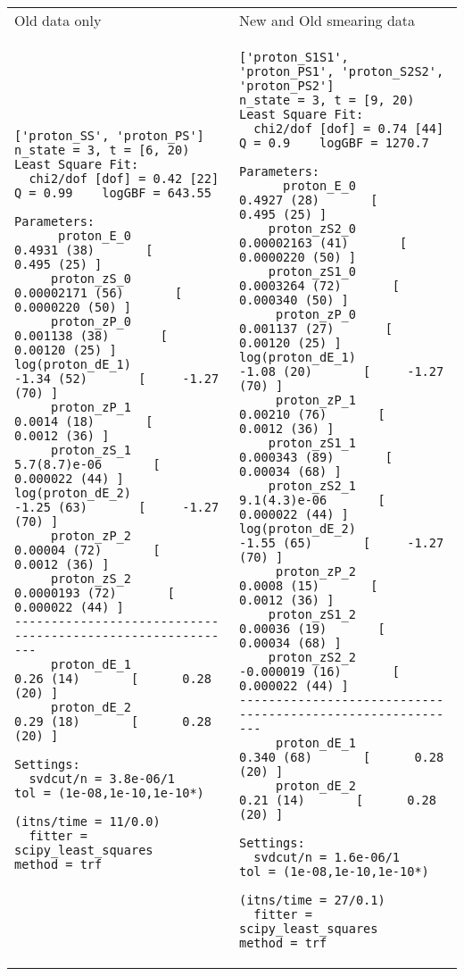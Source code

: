 \documentclass[prd,tightenlines,preprintnumbers,showpacs,superscriptaddress,notitlepage,nofootinbib,eqsecnum,floatfix,notitlepage]{revtex4-1}
\begin{document}
\bigskip
\begin{tabular}{p{3.25in}p{3.25in}}
Old data only & New and Old smearing data\\
{\scriptsize
\begin{verbatim}
['proton_SS', 'proton_PS']
n_state = 3, t = [6, 20)
Least Square Fit:
  chi2/dof [dof] = 0.42 [22]    Q = 0.99    logGBF = 643.55

Parameters:
      proton_E_0       0.4931 (38)       [     0.495 (25) ]
     proton_zS_0   0.00002171 (56)       [ 0.0000220 (50) ]
     proton_zP_0     0.001138 (38)       [   0.00120 (25) ]
log(proton_dE_1)        -1.34 (52)       [     -1.27 (70) ]
     proton_zP_1       0.0014 (18)       [    0.0012 (36) ]
     proton_zS_1      5.7(8.7)e-06       [  0.000022 (44) ]
log(proton_dE_2)        -1.25 (63)       [     -1.27 (70) ]
     proton_zP_2      0.00004 (72)       [    0.0012 (36) ]
     proton_zS_2    0.0000193 (72)       [  0.000022 (44) ]
-----------------------------------------------------------
     proton_dE_1         0.26 (14)       [      0.28 (20) ]
     proton_dE_2         0.29 (18)       [      0.28 (20) ]

Settings:
  svdcut/n = 3.8e-06/1    tol = (1e-08,1e-10,1e-10*)
                   (itns/time = 11/0.0)
  fitter = scipy_least_squares    method = trf\end{verbatim}
}
&
{\scriptsize
\begin{verbatim}
['proton_S1S1', 'proton_PS1', 'proton_S2S2', 'proton_PS2']
n_state = 3, t = [9, 20)
Least Square Fit:
  chi2/dof [dof] = 0.74 [44]    Q = 0.9    logGBF = 1270.7

Parameters:
      proton_E_0       0.4927 (28)       [     0.495 (25) ]
    proton_zS2_0   0.00002163 (41)       [ 0.0000220 (50) ]
    proton_zS1_0    0.0003264 (72)       [  0.000340 (50) ]
     proton_zP_0     0.001137 (27)       [   0.00120 (25) ]
log(proton_dE_1)        -1.08 (20)       [     -1.27 (70) ]
     proton_zP_1      0.00210 (76)       [    0.0012 (36) ]
    proton_zS1_1     0.000343 (89)       [   0.00034 (68) ]
    proton_zS2_1      9.1(4.3)e-06       [  0.000022 (44) ]
log(proton_dE_2)        -1.55 (65)       [     -1.27 (70) ]
     proton_zP_2       0.0008 (15)       [    0.0012 (36) ]
    proton_zS1_2      0.00036 (19)       [   0.00034 (68) ]
    proton_zS2_2    -0.000019 (16)       [  0.000022 (44) ]
-----------------------------------------------------------
     proton_dE_1        0.340 (68)       [      0.28 (20) ]
     proton_dE_2         0.21 (14)       [      0.28 (20) ]

Settings:
  svdcut/n = 1.6e-06/1    tol = (1e-08,1e-10,1e-10*)
                   (itns/time = 27/0.1)
  fitter = scipy_least_squares    method = trf
\end{verbatim}
}
\end{tabular}
\end{document}
